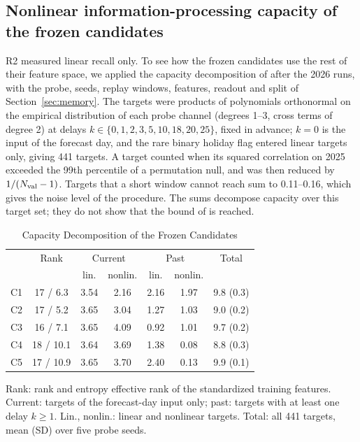 \documentclass[journal]{IEEEtran}
\begin{document}
\subsection{Nonlinear information-processing capacity of the frozen candidates}
\label{sec:capacity}
R2 measured linear recall only. To see how the frozen candidates use the rest of their feature space, we applied the capacity decomposition of \cite{Dambre2012Capacity} after the 2026 runs, with the probe, seeds, replay windows, features, readout and split of Section~\ref{sec:memory}. The targets were products of polynomials orthonormal on the empirical distribution of each probe channel (degrees 1--3, cross terms of degree 2) at delays $k\in\{0,1,2,3,5,10,18,20,25\}$, fixed in advance; $k=0$ is the input of the forecast day, and the rare binary holiday flag entered linear targets only, giving 441 targets. A target counted when its squared correlation on 2025 exceeded the 99th percentile of a permutation null, and was then reduced by $1/(N_{\rm val}-1)$. Targets that a short window cannot reach sum to 0.11--0.16, which gives the noise level of the procedure. The sums decompose capacity over this target set; they do not show that the bound of \cite{Dambre2012Capacity} is reached.

\begin{table}[t]
\centering
\caption{Capacity Decomposition of the Frozen Candidates}
\label{tab:capacity}
\footnotesize
\setlength{\tabcolsep}{3pt}
\begin{tabular}{@{}lcccccc@{}}
\toprule
 & Rank & \multicolumn{2}{c}{Current} & \multicolumn{2}{c}{Past} & Total \\
 & & lin. & nonlin. & lin. & nonlin. & \\
\midrule
C1 & 17 / 6.3 & 3.54 & 2.16 & 2.16 & 1.97 & 9.8 (0.3) \\
C2 & 17 / 5.2 & 3.65 & 3.04 & 1.27 & 1.03 & 9.0 (0.2) \\
C3 & 16 / 7.1 & 3.65 & 4.09 & 0.92 & 1.01 & 9.7 (0.2) \\
C4 & 18 / 10.1 & 3.64 & 3.69 & 1.38 & 0.08 & 8.8 (0.3) \\
C5 & 17 / 10.9 & 3.65 & 3.70 & 2.40 & 0.13 & 9.9 (0.1) \\
\bottomrule
\end{tabular}


\smallskip
\parbox{\columnwidth}{\scriptsize Rank: rank and entropy effective rank of the standardized training features. Current: targets of the forecast-day input only; past: targets with at least one delay $k\ge1$. Lin., nonlin.: linear and nonlinear targets. Total: all 441 targets, mean (SD) over five probe seeds.}
\end{table}
\end{document}
